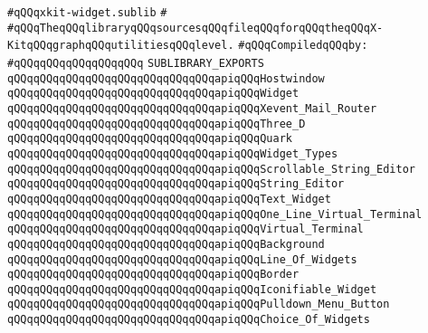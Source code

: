 \label{src/lib/x-kit/widget/xkit-widget.sublib}
\verb|#qQQqxkit-widget.sublib|\newline
\verb|#|\newline
\verb|#qQQqTheqQQqlibraryqQQqsourcesqQQqfileqQQqforqQQqtheqQQqX-KitqQQqgraphqQQqutilitiesqQQqlevel.|\newline
\newline
\verb|#qQQqCompiledqQQqby:|\newline
\verb|#qQQqqQQqqQQqqQQqqQQq|\newline
\newline
\verb|SUBLIBRARY_EXPORTS|\newline
\newline
\verb|qQQqqQQqqQQqqQQqqQQqqQQqqQQqqQQqapiqQQqHostwindow|\newline
\verb|qQQqqQQqqQQqqQQqqQQqqQQqqQQqqQQqapiqQQqWidget|\newline
\verb|qQQqqQQqqQQqqQQqqQQqqQQqqQQqqQQqapiqQQqXevent_Mail_Router|\newline
\verb|qQQqqQQqqQQqqQQqqQQqqQQqqQQqqQQqapiqQQqThree_D|\newline
\verb|qQQqqQQqqQQqqQQqqQQqqQQqqQQqqQQqapiqQQqQuark|\newline
\verb|qQQqqQQqqQQqqQQqqQQqqQQqqQQqqQQqapiqQQqWidget_Types|\newline
\verb|qQQqqQQqqQQqqQQqqQQqqQQqqQQqqQQqapiqQQqScrollable_String_Editor|\newline
\verb|qQQqqQQqqQQqqQQqqQQqqQQqqQQqqQQqapiqQQqString_Editor|\newline
\verb|qQQqqQQqqQQqqQQqqQQqqQQqqQQqqQQqapiqQQqText_Widget|\newline
\verb|qQQqqQQqqQQqqQQqqQQqqQQqqQQqqQQqapiqQQqOne_Line_Virtual_Terminal|\newline
\verb|qQQqqQQqqQQqqQQqqQQqqQQqqQQqqQQqapiqQQqVirtual_Terminal|\newline
\verb|qQQqqQQqqQQqqQQqqQQqqQQqqQQqqQQqapiqQQqBackground|\newline
\verb|qQQqqQQqqQQqqQQqqQQqqQQqqQQqqQQqapiqQQqLine_Of_Widgets|\newline
\verb|qQQqqQQqqQQqqQQqqQQqqQQqqQQqqQQqapiqQQqBorder|\newline
\verb|qQQqqQQqqQQqqQQqqQQqqQQqqQQqqQQqapiqQQqIconifiable_Widget|\newline
\verb|qQQqqQQqqQQqqQQqqQQqqQQqqQQqqQQqapiqQQqPulldown_Menu_Button|\newline
\verb|qQQqqQQqqQQqqQQqqQQqqQQqqQQqqQQqapiqQQqChoice_Of_Widgets|\newline
